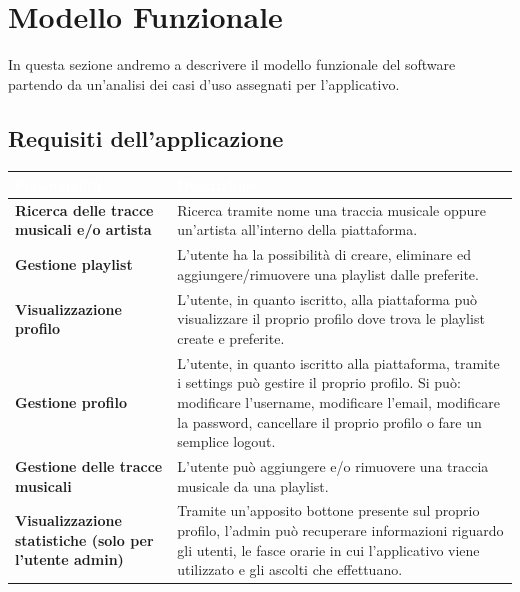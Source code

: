 \documentclass{article}
\begin{document}
	\section{Modello Funzionale}
	In questa sezione andremo a descrivere il modello funzionale del software partendo da un'analisi dei casi d'uso assegnati per l'applicativo.
		\subsection{Requisiti dell'applicazione}
		\begin{tabular}{|p{6cm}|p{8cm}|}
			\hline
			\cellcolor{dark_purple}\textcolor{white}{\textbf{Funzionalità}} & \cellcolor{dark_purple}\textcolor{white}{\textbf{Descrizione}} \\
			\hline
			\textbf{Ricerca delle tracce musicali e/o artista} & Ricerca tramite nome una traccia musicale oppure un'artista all'interno della piattaforma. \\
			\hline
			\textbf{Gestione playlist} & L'utente ha la possibilità di creare, eliminare ed aggiungere/rimuovere una playlist dalle preferite. \\
			\hline
			\textbf{Visualizzazione profilo} & L'utente, in quanto iscritto, alla piattaforma può visualizzare il proprio profilo dove trova le playlist create e preferite. \\
			\hline
			\textbf{Gestione profilo} & L'utente, in quanto iscritto alla piattaforma, tramite i settings può gestire il proprio profilo. Si può: modificare l'username, modificare l'email, modificare la password, cancellare il proprio profilo o fare un semplice logout. \\
			\hline
			\textbf{Gestione delle tracce musicali} & L'utente può aggiungere e/o rimuovere una traccia musicale da una playlist. \\
			\hline
			\textbf{Visualizzazione statistiche (solo per l'utente admin)} & Tramite un'apposito bottone presente sul proprio profilo, l'admin può recuperare informazioni riguardo gli utenti, le fasce orarie in cui l'applicativo viene utilizzato e gli ascolti che effettuano. \\
			\hline
		\end{tabular}
\end{document}
